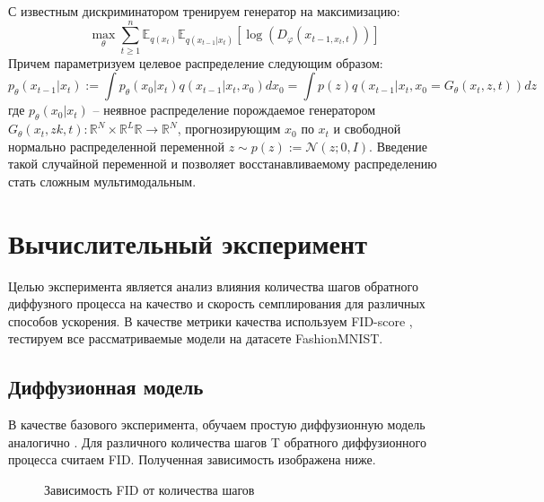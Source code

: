 \documentclass{article}
\begin{document}
С известным дискриминатором тренируем генератор на максимизацию:
 \begin{equation}
	\max\limits_\theta\sum\limits_{t\geqslant 1}^n \mathbb{E}_{q(x_t)}\mathbb{E}_{q(x_{t-1}|x_t)}[\log{(D_\varphi(x_{t-1, x_t, t}))}]
\end{equation}
Причем параметризуем целевое распределение следующим образом:
 \begin{equation}
	p_\theta(x_{t-1}|x_t) := \int p_\theta(x_0|x_t)q(x_{t-1}|x_t, x_0)dx_0 =\int p(z)q(x_{t-1}|x_t, x_0 = G_\theta(x_t, z, t))dz
\end{equation}
где $p_\theta(x_0|x_t)$ -- неявное распределение порождаемое генератором $G_\theta(x_t, zk, t):\mathbb{R}^N\times\mathbb{R}^L\mathbb{R}\to \mathbb{R}^N$, прогнозирующим $x_0$ по $x_t$ и свободной нормально распределенной переменной $z\sim p(z) := \mathcal{N}(z; 0, I)$. Введение такой случайной переменной и позволяет восстанавливаемому распределению стать сложным мультимодальным.

 \section{Вычислительный эксперимент}
Целью эксперимента является анализ влияния количества шагов обратного диффузного процесса на качество и скорость семплирования для различных способов ускорения. В качестве метрики качества используем FID-score \cite{https://doi.org/10.48550/arxiv.1706.08500}, тестируем все рассматриваемые модели на датасете FashionMNIST. 


\subsection{Диффузионная модель}
В качестве базового эксперимента, обучаем простую диффузионную модель аналогично \cite{https://doi.org/10.48550/arxiv.2006.11239}. Для различного количества шагов T обратного диффузионного процесса считаем FID. Полученная зависимость изображена ниже.

\newpage

\begin{figure}[h]
	\caption{Зависимость FID от количества шагов}
\end{figure}
\end{document}

